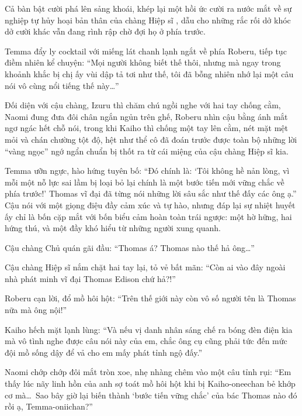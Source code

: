 \documentclass[../main.tex]{subfiles}
\begin{document}
Cả bàn bật cười phá lên sảng khoái, khép lại một hồi ức cười ra nước mắt về sự nghiệp tự hủy hoại bản thân của chàng Hiệp sĩ \hls, dẫu cho những rắc rối dở khóc dở cười khác vẫn đang rình rập chờ đợi họ ở phía trước.

\ct

Temma đẩy ly cocktail với miếng lát chanh lạnh ngắt về phía Roberu, tiếp tục điềm nhiên kể chuyện: ``Mọi người không biết thế thôi, nhưng mà ngay trong khoảnh khắc bị chị ấy vùi dập tả tơi như thế, tôi đã bỗng nhiên nhớ lại một câu nói vô cùng nổi tiếng thế này\dots''

Đối diện với cậu chàng, Izuru thì chăm chú ngồi nghe với hai tay chống cằm, Naomi đung đưa đôi chân ngắn ngủn trên ghế, Roberu nhìn cậu bằng ánh mắt ngơ ngác hết chỗ nói, trong khi Kaiho thì chống một tay lên cằm, nét mặt mệt mỏi và chán chường tột độ, hệt như thể cô đã đoán trước được toàn bộ những lời ``vàng ngọc'' ngớ ngẩn chuẩn bị thốt ra từ cái miệng của cậu chàng Hiệp sĩ kia.


Temma ưỡn ngực, hào hứng tuyên bố: ``Đó chính là: `Tôi không hề nản lòng, vì mỗi một nỗ lực sai lầm bị loại bỏ lại chính là một bước tiến mới vững chắc về phía trước!' Thomas vĩ đại đã từng nói những lời sâu sắc như thế đấy các ông ạ.'' Cậu nói với một giọng điệu đầy cảm xúc và tự hào, nhưng đáp lại sự nhiệt huyết ấy chỉ là bốn cặp mắt với bốn biểu cảm hoàn toàn trái ngược: một hờ hững, hai hứng thú, và một đầy khó hiểu từ những người xung quanh.

Cậu chàng Chủ quán gãi đầu: ``Thomas á? Thomas nào thế hả ông\dots''

Cậu chàng Hiệp sĩ nắm chặt hai tay lại, tỏ vẻ bất mãn: ``Còn ai vào đây ngoài nhà phát minh vĩ đại Thomas Edison chứ hả?!''

Roberu cạn lời, đổ mồ hôi hột: ``Trên thế giới này còn vô số người tên là Thomas nữa mà ông nội!''


Kaiho hếch mặt lạnh lùng: ``Và nếu vị danh nhân sáng chế ra bóng đèn điện kia mà vô tình nghe được câu nói này của em, chắc ông cụ cũng phải tức đến mức đội mồ sống dậy để vả cho em mấy phát tỉnh ngộ đấy.''

Naomi chớp chớp đôi mắt tròn xoe, nhẹ nhàng chêm vào một câu tỉnh rụi: ``Em thấy lúc nãy linh hồn của anh sợ toát mồ hôi hột khi bị Kaiho-oneechan bẻ khớp cơ mà\dots\ Sao bây giờ lại biến thành `bước tiến vững chắc' của bác Thomas nào đó rồi ạ, Temma-oniichan?''
\end{document}
